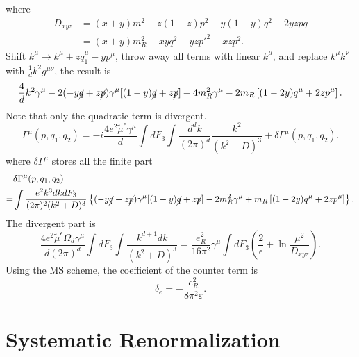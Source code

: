 \documentclass[aps,prb,superscriptaddress,nofootinbib]{revtex4}
\begin{document}
where 
\begin{equation*}
\begin{aligned}
	D_{xyz} &= (x+y)m^2 - z(1-z)p^2- y(1-y)q^2-2yzpq \\
	&=(x+y)m_R^2 - xy q^2- yz p'^2 - xz p^2.
\end{aligned}
\end{equation*}
Shift $k^\mu \rightarrow k^\mu + z q_1^\mu - y p^\mu$, throw away all terms with linear $k^\mu$, and replace $k^\mu k^\nu$ with $\frac{1}{d}k^2 g^{\mu\nu}$, the result is
\begin{equation*}
	\frac{4}{d}k^2\gamma^\mu  -2(-y \cancel{q}+z \cancel{p}) \gamma^{\mu}[(1-y) \cancel q+z \cancel p] +4 m_R^{2} \gamma^{\mu}-2 m_R\left[(1-2 y) q^{\mu}+2 z p^{\mu}\right].
\end{equation*}
Note that only the quadratic term is divergent. 
\begin{equation*}
	\Gamma^\mu(p,q_1,q_2) = -i\frac{4e^2\tilde{\mu}^{\epsilon} \gamma^\mu}{d}  \int dF_3 \int \frac{d^dk}{(2\pi)^d} \frac{k^2}{(k^2-D)^3} + \delta\Gamma^\mu(p,q_1,q_2).
\end{equation*}
where $\delta \Gamma^\mu$ stores all the finite part
\begin{equation*}
\begin{aligned}
	& \delta\Gamma^\mu(p,q_1,q_2) \\
	=& \int \frac{e^2 k^3 dk dF_3}{(2\pi)^2(k^2+D)^3} \left\{(-y \cancel{q}+z \cancel{p}) \gamma^{\mu}[(1-y) \cancel q+z \cancel p] -2 m_R^{2} \gamma^{\mu}+ m_R\left[(1-2 y) q^{\mu}+2 z p^{\mu}\right]\right\}.
\end{aligned}
\end{equation*}
The divergent part is
\begin{equation}
	\frac{4 e^2\tilde{\mu}^{\epsilon} \Omega_d \gamma^\mu}{d(2\pi)^d}\int dF_3 \int \frac{k^{d+1}dk}{(k^2+D)^3}
	= \frac{e_R^2}{16\pi^2} \gamma^\mu \int dF_3 \left(\frac{2}{\epsilon}+\ln\frac{\mu^2}{D_{xyz}}\right).
\end{equation}
Using the $\overline{\mathrm{MS}}$ scheme, the coefficient of the counter term is
\begin{equation}
	\delta_e = -\frac{e_R^2}{8\pi^2\varepsilon}.
\end{equation}



\section{Systematic Renormalization}
\end{document}
